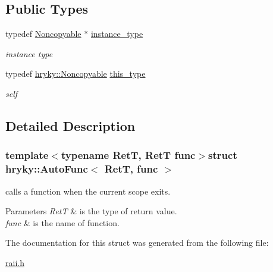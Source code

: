 \subsection*{Public Types}
\begin{DoxyCompactItemize}
\item 
\hypertarget{classhryky_1_1_noncopyable_aaf87abb55f700af85ecb0895f6178821}{typedef \hyperlink{classhryky_1_1_noncopyable}{Noncopyable} $\ast$ \hyperlink{classhryky_1_1_noncopyable_aaf87abb55f700af85ecb0895f6178821}{instance\-\_\-type}}\label{classhryky_1_1_noncopyable_aaf87abb55f700af85ecb0895f6178821}

\begin{DoxyCompactList}\small\item\em instance type \end{DoxyCompactList}\item 
\hypertarget{classhryky_1_1_noncopyable_acf13ad1c98a76247a561dff514979da5}{typedef \hyperlink{classhryky_1_1_noncopyable}{hryky\-::\-Noncopyable} \hyperlink{classhryky_1_1_noncopyable_acf13ad1c98a76247a561dff514979da5}{this\-\_\-type}}\label{classhryky_1_1_noncopyable_acf13ad1c98a76247a561dff514979da5}

\begin{DoxyCompactList}\small\item\em self \end{DoxyCompactList}\end{DoxyCompactItemize}


\subsection{Detailed Description}
\subsubsection*{template$<$typename Ret\-T, Ret\-T  func$>$struct hryky\-::\-Auto\-Func$<$ Ret\-T, func $>$}

calls a function when the current scope exits. 


\begin{DoxyParams}{Parameters}
{\em Ret\-T} & is the type of return value. \\
\hline
{\em func} & is the name of function. \\
\hline
\end{DoxyParams}


The documentation for this struct was generated from the following file\-:\begin{DoxyCompactItemize}
\item 
\hyperlink{raii_8h}{raii.\-h}\end{DoxyCompactItemize}
